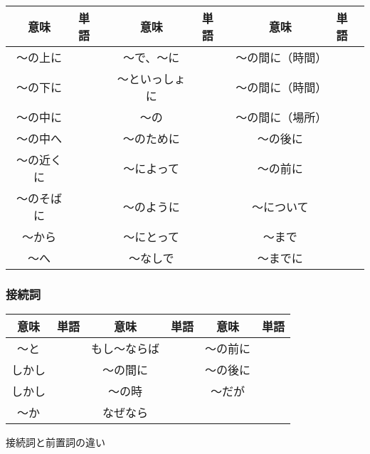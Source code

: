 \documentclass[10pt]{jsarticle}
\begin{document}
{\renewcommand\arraystretch{1.8}
  \begin{table}[H]
    \centering
    \begin{tabular}{|c|p{2cm}||c|p{2cm}||c|p{2cm}|}
      \hline
      意味       & 単語 & 意味           & 単語 & 意味             & 単語 \\ \hline\hline
      〜の上に   &      & 〜で、〜に     &      & 〜の間に（時間） &      \\ \hline
      〜の下に   &      & 〜といっしょに &      & 〜の間に（時間） &      \\ \hline
      〜の中に   &      & 〜の           &      & 〜の間に（場所） &      \\ \hline
      〜の中へ   &      & 〜のために     &      & 〜の後に         &      \\ \hline
      〜の近くに &      & 〜によって     &      & 〜の前に         &      \\ \hline
      〜のそばに &      & 〜のように     &      & 〜について       &      \\ \hline
      〜から     &      & 〜にとって     &      & 〜まで           &      \\ \hline
      〜へ       &      & 〜なしで       &      & 〜までに         &      \\ \hline
    \end{tabular}
  \end{table}
}

\subsubsection*{接続詞}


{\renewcommand\arraystretch{1.8}
  \begin{table}[H]
    \centering
    \begin{tabular}{|c|p{2cm}||c|p{2cm}||c|p{2cm}|}
      \hline
      意味   & 単語 & 意味         & 単語 & 意味     & 単語 \\ \hline\hline
      〜と   &      & もし〜ならば &      & 〜の前に &      \\ \hline
      しかし &      & 〜の間に     &      & 〜の後に &      \\ \hline
      しかし &      & 〜の時       &      & 〜だが   &      \\ \hline
      〜か   &      & なぜなら     &      &          &      \\ \hline
    \end{tabular}
  \end{table}
}

\begin{itembox}[l]{接続詞と前置詞の違い}
  \vspace{1cm}
\end{itembox}
\end{document}
